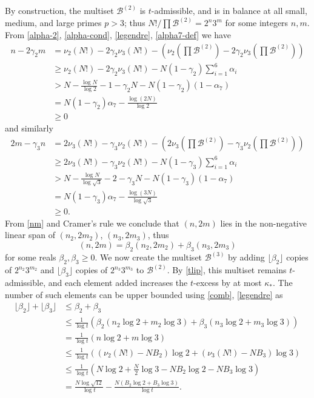 \documentclass[10pt,a4paper,reqno]{amsart}
\numberwithin{equation}{section}
\theoremstyle{plain}
\theoremstyle{definition}
\newcommand\tuple{{\mathcal B}}
\begin{document}
By construction, the multiset $\tuple^{(2)}$ is $t$-admissible, and is in balance at all small, medium, and large primes $p > 3$; thus $N!/\prod \tuple^{(2)} = 2^n 3^m$ for some integers $n,m$.  From \eqref{alpha-2}, \eqref{alpha-cond}, \eqref{legendre}, \eqref{alpha7-def} we have
\begin{align*}
n - 2\gamma_2 m &= \nu_2(N!) - 2\gamma_2 \nu_3(N!) - \left(\nu_2\left(\prod \tuple^{(2)}\right) - 2\gamma_2 \nu_3\left(\prod \tuple^{(2)}\right)\right) \\
&\geq \nu_2(N!) - 2\gamma_2 \nu_3(N!) - N (1-\gamma_2) \sum_{i=1}^6 \alpha_i \\
&> N - 
 \frac{\log N}{\log 2} - 1 - \gamma_2 N - N (1-\gamma_2) (1 - \alpha_7) \\
&= N (1-\gamma_2) \alpha_7 - \frac{\log(2N)}{\log 2} \\
&\geq 0
\end{align*}
and similarly
\begin{align*}
  2m - \gamma_3 n &= 2\nu_3(N!) - \gamma_3 \nu_2(N!) - \left(2\nu_3\left(\prod \tuple^{(2)}\right) - \gamma_3 \nu_2\left(\prod \tuple^{(2)}\right)\right) \\
&\geq 2\nu_3(N!) - \gamma_3 \nu_2(N!) - N (1-\gamma_3) \sum_{i=1}^6 \alpha_i \\
&> N - \frac{\log N}{\log \sqrt{3}} - 2 - \gamma_3 N - N (1-\gamma_3) (1 - \alpha_7) \\ 
&= N (1-\gamma_3) \alpha_7 - \frac{\log(3N)}{\log \sqrt{3}} \\
&\geq 0.
\end{align*}
From \eqref{nm} and Cramer's rule we conclude that $(n,2m)$ lies in the non-negative linear span of $(n_2, 2m_2)$, $(n_3, 2m_3)$, thus
\begin{equation}\label{comb}  (n,2m) = \beta_2 (n_2,2m_2) + \beta_3 (n_3,2m_3)\end{equation}
for some reals $\beta_2,\beta_3 \geq 0$.
We now create the multiset $\tuple^{(3)}$ by adding $\lfloor \beta_2 \rfloor$ copies of $2^{n_2} 3^{m_2}$ and $\lfloor \beta_3 \rfloor$ copies of $2^{n_3} 3^{m_3}$ to $\tuple^{(2)}$.  By \eqref{tlip}, this multiset remains $t$-admissible, and each element added increases the $t$-excess by at most $\kappa_*$.  The number of such elements can be upper bounded using \eqref{comb}, \eqref{legendre} as
\begin{align*}
  \lfloor \beta_2 \rfloor + \lfloor \beta_3 \rfloor &\leq \beta_2 + \beta_3 \\
  &\leq \frac{1}{\log t} \left( \beta_2 (n_2 \log 2 + m_2 \log 3) + \beta_3 (n_3 \log 2 + m_3 \log 3) \right) \\
  &= \frac{1}{\log t} (n \log 2 + m \log 3) \\
  &\leq \frac{1}{\log t} ((\nu_2(N!)-NB_2) \log 2 + (\nu_3(N!)-NB_3) \log 3) \\
  &\leq \frac{1}{\log t} \left(N \log 2 + \frac{N}{2} \log 3 - NB_2 \log 2 - NB_3 \log 3\right) \\
  &= \frac{N \log \sqrt{12}}{\log t} - \frac{N(B_2 \log 2 + B_3 \log 3)}{\log t}.
\end{align*}
\end{document}
